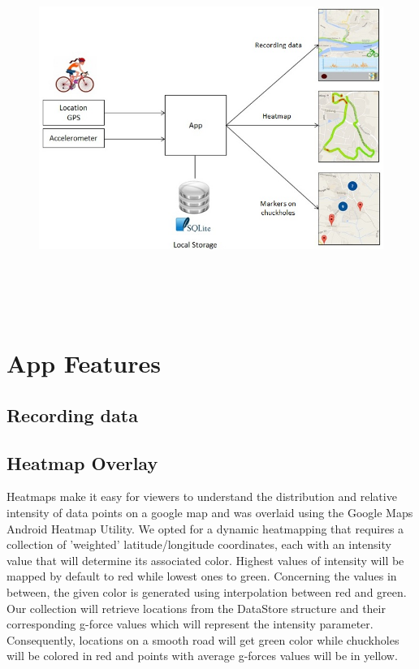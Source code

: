 \documentclass[10pt,a4paper]{article} %
\begin{document}
	\begin{figure}[H]
	\centering
    \includegraphics[width=16cm, height=12cm]{pic1}
    
    \end{figure}
    
    
    
    
    \section{App Features}
    
    \subsection{ Recording data}
    
    
    
    
    \subsection{ Heatmap Overlay}
    
    Heatmaps make it easy for viewers to understand the distribution and relative intensity of data points on a google map and was overlaid using the Google Maps Android Heatmap Utility.
    We opted for a dynamic heatmapping that requires a collection of 'weighted' latitude/longitude coordinates, each with an intensity value that will determine its associated color.
    Highest values of intensity will be mapped by default to red while lowest ones to green. Concerning the values in between, the given color is generated using interpolation between red and green. 
    Our collection will retrieve locations from the DataStore structure and their corresponding g-force values which will represent the intensity parameter. Consequently, locations on a smooth road will get green color while chuckholes will be colored in red and points with average g-forces values will be in yellow.
     
\end{document}
